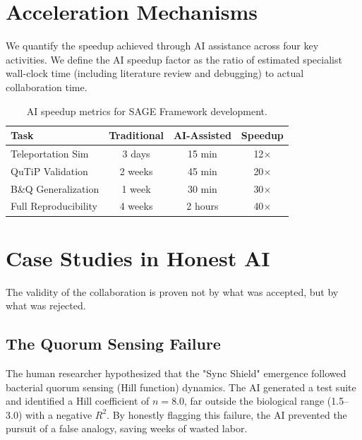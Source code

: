 \documentclass[aps,pra,reprint,amsmath,amssymb,superscriptaddress]{revtex4-2}
\begin{document}
\section{Acceleration Mechanisms}

We quantify the speedup achieved through AI assistance across four key activities. We define the AI speedup factor as the ratio of estimated specialist wall-clock time (including literature review and debugging) to actual collaboration time.

\begin{table}[h]
\caption{AI speedup metrics for SAGE Framework development.}
\label{tab:speedup}
\begin{ruledtabular}
\begin{tabular}{lccc}
Task & Traditional & AI-Assisted & Speedup \\
\hline
Teleportation Sim & 3 days & 15 min & 12$\times$ \\
QuTiP Validation & 2 weeks & 45 min & 20$\times$ \\
B\&Q Generalization & 1 week & 30 min & 30$\times$ \\
Full Reproducibility & 4 weeks & 2 hours & 40$\times$ \\
\end{tabular}
\end{ruledtabular}
\end{table}


\section{Case Studies in Honest AI}

The validity of the collaboration is proven not by what was accepted, but by what was rejected.

\subsection{The Quorum Sensing Failure}
The human researcher hypothesized that the "Sync Shield" emergence followed bacterial quorum sensing (Hill function) dynamics. The AI generated a test suite and identified a Hill coefficient of $n=8.0$, far outside the biological range (1.5--3.0) with a negative $R^2$. By honestly flagging this failure, the AI prevented the pursuit of a false analogy, saving weeks of wasted labor.
\end{document}
